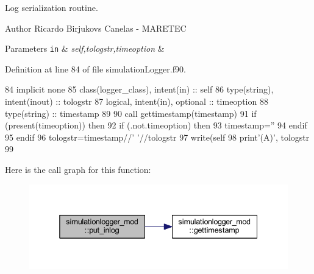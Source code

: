 Log serialization routine. 

\begin{DoxyAuthor}{Author}
Ricardo Birjukovs Canelas -\/ M\+A\+R\+E\+T\+EC 
\end{DoxyAuthor}

\begin{DoxyParams}[1]{Parameters}
\mbox{\tt in}  & {\em self,tologstr,timeoption} & \\
\hline
\end{DoxyParams}


Definition at line 84 of file simulation\+Logger.\+f90.


\begin{DoxyCode}
84     \textcolor{keywordtype}{implicit none}
85     \textcolor{keywordtype}{class}(logger\_class), \textcolor{keywordtype}{intent(in)} :: self
86     \textcolor{keywordtype}{type}(string), \textcolor{keywordtype}{intent(inout)} :: tologstr
87     \textcolor{keywordtype}{logical}, \textcolor{keywordtype}{intent(in)}, \textcolor{keywordtype}{optional} :: timeoption
88     \textcolor{keywordtype}{type}(string) :: timestamp
89 
90     \textcolor{keyword}{call }gettimestamp(timestamp)
91     \textcolor{keywordflow}{if} (\textcolor{keyword}{present}(timeoption)) \textcolor{keywordflow}{then}
92         \textcolor{keywordflow}{if} (.not.timeoption) \textcolor{keywordflow}{then}
93             timestamp=\textcolor{stringliteral}{''}
94 \textcolor{keywordflow}{        endif}
95 \textcolor{keywordflow}{    endif}
96     tologstr=timestamp//\textcolor{stringliteral}{' '}//tologstr
97     \textcolor{keyword}{write}(self%
98     print\textcolor{stringliteral}{'(A)'}, tologstr%
99 
\end{DoxyCode}
Here is the call graph for this function\+:\nopagebreak
\begin{figure}[H]
\begin{center}
\leavevmode
\includegraphics[width=338pt]{namespacesimulationlogger__mod_a3bf437b875b454ef326a3bc660542539_cgraph}
\end{center}
\end{figure}


